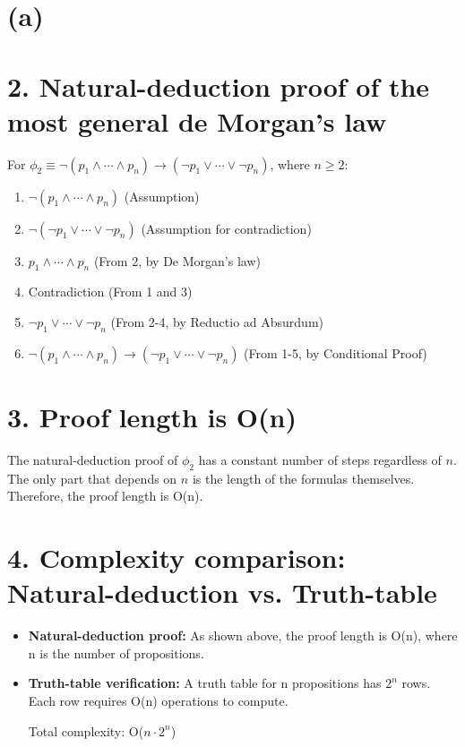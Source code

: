 \documentclass{article}
\newenvironment{proof}
{\begin{mdframed}[linewidth=0.5pt]\begin{enumerate}[label=\arabic*.,leftmargin=*]}
{\end{enumerate}\end{mdframed}}
\begin{document}
\section*{(a)}

\section*{2. Natural-deduction proof of the most general de Morgan's law}

For $\phi_2 \equiv \neg(p_1 \land \cdots \land p_n) \to (\neg p_1 \lor \cdots \lor \neg p_n)$, where $n \geq 2$:

\begin{proof}
\begin{enumerate}
    \item $\neg(p_1 \land \cdots \land p_n)$ \hfill (Assumption)
    \item $\neg(\neg p_1 \lor \cdots \lor \neg p_n)$ \hfill (Assumption for contradiction)
    \item $p_1 \land \cdots \land p_n$ \hfill (From 2, by De Morgan's law)
    \item Contradiction \hfill (From 1 and 3)
    \item $\neg p_1 \lor \cdots \lor \neg p_n$ \hfill (From 2-4, by Reductio ad Absurdum)
    \item $\neg(p_1 \land \cdots \land p_n) \to (\neg p_1 \lor \cdots \lor \neg p_n)$ \hfill (From 1-5, by Conditional Proof)
\end{enumerate}
\end{proof}

\newpage

\section*{3. Proof length is O(n)}

The natural-deduction proof of $\phi_2$ has a constant number of steps regardless of $n$. The only part that depends on $n$ is the length of the formulas themselves. Therefore, the proof length is O(n).

\newpage

\section*{4. Complexity comparison: Natural-deduction vs. Truth-table}

\begin{itemize}
    \item \textbf{Natural-deduction proof:} As shown above, the proof length is O(n), where n is the number of propositions.
    
    \item \textbf{Truth-table verification:} A truth table for n propositions has $2^n$ rows. Each row requires O(n) operations to compute.
    
    Total complexity: O($n \cdot 2^n$)
\end{itemize}
\end{document}
